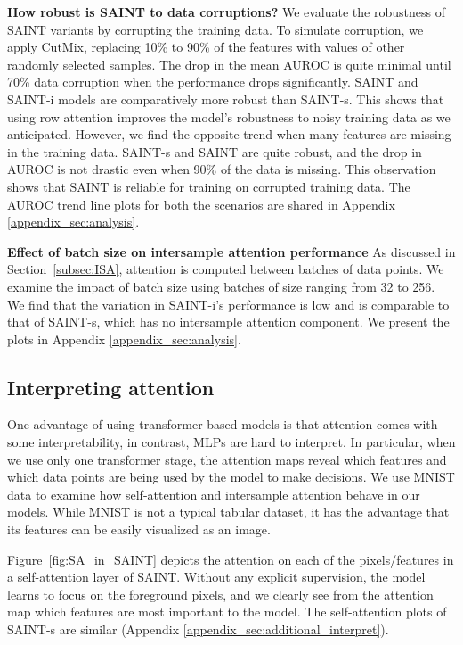 \documentclass{article}
\begin{document}
\textbf{How robust is SAINT to data corruptions?} We evaluate the robustness of SAINT variants by corrupting the training data.  To simulate corruption, we apply CutMix, replacing 10\% to 90\% of the features with values of other randomly selected samples. The drop in the mean AUROC is quite minimal until 70\% data corruption when the performance drops significantly. SAINT and SAINT-i models are comparatively more robust than SAINT-s. This shows that using row attention improves the model's robustness to noisy training data as we anticipated. However, we find the opposite trend when many features are missing in the training data. SAINT-s and SAINT are quite robust, and the drop in AUROC is not drastic even when 90\% of the data is missing. This observation shows that SAINT is reliable for training on corrupted training data. The AUROC trend line plots for both the scenarios are shared in Appendix \ref{appendix_sec:analysis}.

\textbf{Effect of batch size on intersample attention performance} As discussed in Section~\ref{subsec:ISA}, attention is computed between batches of data points. We examine the impact of batch size using batches of size ranging from 32 to 256. We find that the variation in SAINT-i's performance is low and is comparable to that of SAINT-s, which has no intersample attention component. We present the plots in Appendix \ref{appendix_sec:analysis}.

\subsection{Interpreting attention}
\label{subsec:attention_analysis}
One advantage of using transformer-based models is that attention comes with some interpretability, in contrast, MLPs are hard to interpret. In particular, when we use only one transformer stage, the attention maps reveal which features and which data points are being used by the model to make decisions. We use MNIST data to examine how self-attention and intersample attention behave in our models. While MNIST is not a typical tabular dataset, it has the advantage that its features can be easily visualized as an image.

Figure~\ref{fig:SA_in_SAINT} depicts the attention on each of the pixels/features in a self-attention layer of SAINT. Without any explicit supervision, the model learns to focus on the foreground pixels, and we clearly see from the attention map which features are most important to the model. The self-attention plots of SAINT-s are similar (Appendix \ref{appendix_sec:additional_interpret}).
\end{document}
